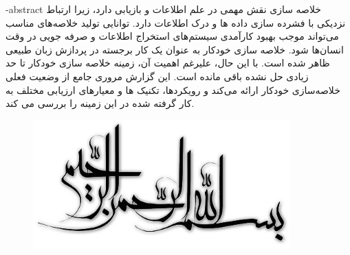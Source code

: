 \department{}

\fa-abstract{
	خلاصه سازی نقش مهمی در علم اطلاعات و بازیابی دارد، زیرا ارتباط نزدیکی با فشرده سازی داده ها و درک اطلاعات دارد. توانایی تولید خلاصه‌های مناسب می‌تواند موجب بهبود کارآمدی سیستم‌های استخراج اطلاعات و صرفه جویی در وقت انسان‌ها شود. خلاصه سازی خودکار به عنوان یک کار برجسته در پردازش زبان طبیعی 
	ظاهر شده است. با این حال، علیرغم اهمیت آن، زمینه خلاصه سازی خودکار تا حد زیادی حل نشده باقی مانده است. این گزارش مروری جامع از وضعیت فعلی خلاصه‌سازی خودکار ارائه می‌کند و رویکردها، تکنیک ها و معیارهای ارزیابی مختلف به کار گرفته شده در این زمینه را بررسی می کند.
}





\AUTtitle
\vspace*{7cm}
\thispagestyle{empty}
\begin{center}
\includegraphics[height=5cm,width=12cm]{besm}
\end{center}
